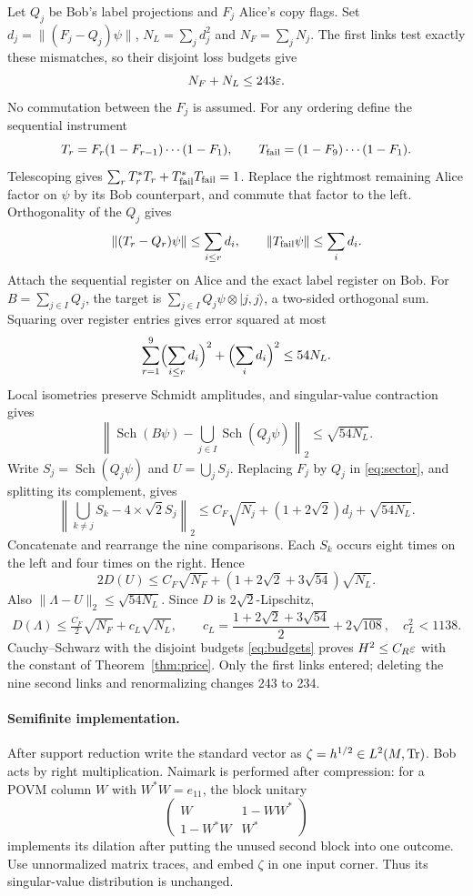 Let $Q_j$ be Bob's label projections and $F_j$ Alice's copy flags. Set $d_j=\|(F_j-Q_j)\psi\|$, $N_L=\sum_jd_j^2$ and $N_F=\sum_jN_j$. The first links test exactly these mismatches, so their disjoint loss budgets give
\begin{equation}\label{eq:budgets}
 N_F+N_L\le243\varepsilon.
\end{equation}
No commutation between the $F_j$ is assumed. For any ordering define the sequential instrument
\[
 T_r=F_r(1-F_{r-1})\cdots(1-F_1),\qquad
 T_{\rm fail}=(1-F_9)\cdots(1-F_1).
\]
Telescoping gives $\sum_rT_r^*T_r+T_{\rm fail}^*T_{\rm fail}=1$. Replace the rightmost remaining Alice factor on $\psi$ by its Bob counterpart, and commute that factor to the left. Orthogonality of the $Q_j$ gives
\[
 \|(T_r-Q_r)\psi\|\le\sum_{i\le r}d_i,\qquad
 \|T_{\rm fail}\psi\|\le\sum_id_i.
\]
Attach the sequential register on Alice and the exact label register on Bob. For $B=\sum_{j\in I}Q_j$, the target is $\sum_{j\in I}Q_j\psi\otimes|j,j\rangle$, a two-sided orthogonal sum. Squaring over register entries gives error squared at most
\[
 \sum_{r=1}^9\Bigl(\sum_{i\le r}d_i\Bigr)^2+
 \Bigl(\sum_id_i\Bigr)^2\le54N_L.
\]
Local isometries preserve Schmidt amplitudes, and singular-value contraction gives
\[
 \left\|\operatorname{Sch}(B\psi)
       -\bigcup_{j\in I}\operatorname{Sch}(Q_j\psi)\right\|_2
 \le\sqrt{54N_L}.
\]
Write $S_j=\operatorname{Sch}(Q_j\psi)$ and $U=\bigcup_jS_j$. Replacing $F_j$ by $Q_j$ in \eqref{eq:sector}, and splitting its complement, gives
\[
 \left\|\bigcup_{k\ne j}S_k-4\mathbin{\times}\sqrt2S_j\right\|_2
 \le C_F\sqrt{N_j}+(1+2\sqrt2)d_j+\sqrt{54N_L}.
\]
Concatenate and rearrange the nine comparisons. Each $S_k$ occurs eight times on the left and four times on the right. Hence
\[
 2D(U)\le C_F\sqrt{N_F}+(1+2\sqrt2+3\sqrt{54})\sqrt{N_L}.
\]
Also $\|\Lambda-U\|_2\le\sqrt{54N_L}$. Since $D$ is $2\sqrt2$-Lipschitz,
\[
 D(\Lambda)\le\tfrac{C_F}{2}\sqrt{N_F}+c_L\sqrt{N_L},\qquad
 c_L=\frac{1+2\sqrt2+3\sqrt{54}}2+2\sqrt{108},\quad c_L^2<1138.
\]
Cauchy--Schwarz with the disjoint budgets \eqref{eq:budgets} proves $H^2\le C_R\varepsilon$ with the constant of Theorem~\ref{thm:price}. Only the first links entered; deleting the nine second links and renormalizing changes 243 to 234.

\paragraph{Semifinite implementation.}
After support reduction write the standard vector as $\zeta=h^{1/2}\in L^2(M,\operatorname{Tr})$. Bob acts by right multiplication. Naimark is performed after compression: for a POVM column $W$ with $W^*W=e_{11}$, the block unitary
\[
 \begin{pmatrix}W&1-WW^*\\1-W^*W&W^*\end{pmatrix}
\]
implements its dilation after putting the unused second block into one outcome. Use unnormalized matrix traces, and embed $\zeta$ in one input corner. Thus its singular-value distribution is unchanged.

